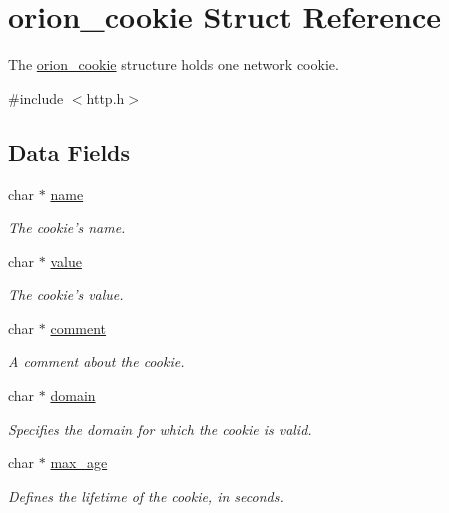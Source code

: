 \hypertarget{structorion__cookie}{
\section{orion\_\-cookie Struct Reference}
\label{structorion__cookie}
}


The \hyperlink{structorion__cookie}{orion\_\-cookie} structure holds one network cookie.  




{\ttfamily \#include $<$http.h$>$}

\subsection*{Data Fields}
\begin{DoxyCompactItemize}
\item 
char $\ast$ \hyperlink{structorion__cookie_a5ac083a645d964373f022d03df4849c8}{name}
\begin{DoxyCompactList}\small\item\em The cookie's name. \item\end{DoxyCompactList}\item 
char $\ast$ \hyperlink{structorion__cookie_a4e9aec275e566b978a3ccb4e043d8c61}{value}
\begin{DoxyCompactList}\small\item\em The cookie's value. \item\end{DoxyCompactList}\item 
char $\ast$ \hyperlink{structorion__cookie_a25dae25c3bf9b28d54eb4df7afb2a491}{comment}
\begin{DoxyCompactList}\small\item\em A comment about the cookie. \item\end{DoxyCompactList}\item 
char $\ast$ \hyperlink{structorion__cookie_ac7098a8cde5110cd169c9958dca2d4d0}{domain}
\begin{DoxyCompactList}\small\item\em Specifies the domain for which the cookie is valid. \item\end{DoxyCompactList}\item 
char $\ast$ \hyperlink{structorion__cookie_aebc91fcebea283d9fa426edad5d89355}{max\_\-age}
\begin{DoxyCompactList}\small\item\em Defines the lifetime of the cookie, in seconds. \item\end{DoxyCompactList}\item 

\end{DoxyCompactItemize}
